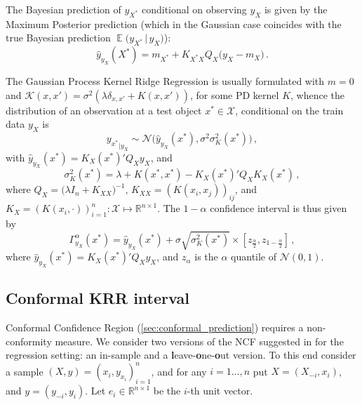 \documentclass{ITaSconf}
\newcommand{\ex}{\mathop{\mathbb{E}}\nolimits}
\newcommand{\Ncal}{\mathcal{N}}
\newcommand{\Kcal}{\mathcal{K}}
\newcommand{\Xcal}{\mathcal{X}}
\newcommand{\Real}{\mathbb{R}}
\begin{document}
The Bayesian prediction of $y_{X^*}$ conditional on observing $y_X$ is given by
the Maximum Posterior prediction (which in the Gaussian case coincides with the
true Bayesian prediction $\ex\bigl(y_{X^*}\,|\, y_X\bigr)$):
\begin{equation*}
  \hat{y}_{y_X}(X^*) = m_{X^*} + K_{X^*X} Q_X \bigl(y_X - m_X\bigr) \,.
\end{equation*}

The Gaussian Process Kernel Ridge Regression is usually formulated with $m=0$ and
$\Kcal(x,x') = \sigma^2(\lambda \delta_{x,x'} + K(x,x'))$, for some PD kernel $K$,
whence the distribution of an observation at a test object $x^*\in \Xcal$, conditional
on the train data $y_X$ is
\begin{equation} \label{eq:gp_cond_dist}
{y_{x^*}}_{|y_X}
  \sim \Ncal\bigl( \hat{y}_{y_X}(x^*), \sigma^2 \sigma_K^2(x^*) \bigr) \,,
\end{equation}
with $\hat{y}_{y_X}(x^*) = K_X(x^*)' Q_X y_X$, and
\begin{equation*}
  \sigma_K^2(x^*)
    = \lambda + K(x^*, x^*) - K_X(x^*)' Q_X K_X(x^*) \,,
\end{equation*}
where $Q_X = \bigl(\lambda I_n + K_{XX}\bigr)^{-1}$, $K_{XX} = (K(x_i,x_j))_{ij}$,
and $K_X = (K(x_i, \cdot))_{i=1}^n: \Xcal \mapsto \Real^{n\times1}$. The $1-\alpha$
confidence interval is thus given by
\begin{equation} \label{eq:gp_conf_int}
\Gamma^\alpha_{y_X}(x^*)
  = \hat{y}_{y_X}(x^*)
  + \sigma \sqrt{\sigma_K^2(x^*)}
  \times [z_{\frac{\alpha}{2}}, z_{1-\frac{\alpha}{2}}]
  \,,
\end{equation}
where $\hat{y}_{y_X}(x^*) = K_X(x^*)' Q_X y_X$, and $z_\alpha$ is the $\alpha$
quantile of $\Ncal(0, 1)$.


\subsection{Conformal KRR interval} %
\label{sub:conformal_krr_interval}

Conformal Confidence Region (\ref{sec:conformal_prediction}) requires a non-conformity
measure. We consider two versions of the NCF suggested in \cite{vovk2005} for the
regression setting: an in-sample and a \textbf{l}eave-\textbf{o}ne-\textbf{o}ut version.
To this end consider a sample $(X, y) = (x_i, y_{x_i})_{i=1}^n$, and for any $i=1\ldots, n$
put $X = (X_{-i}, x_i)$, and $y = (y_{-i}, y_i)$. Let $e_i\in \Real^{n\times 1}$ be
the $i$-th unit vector.
\end{document}

